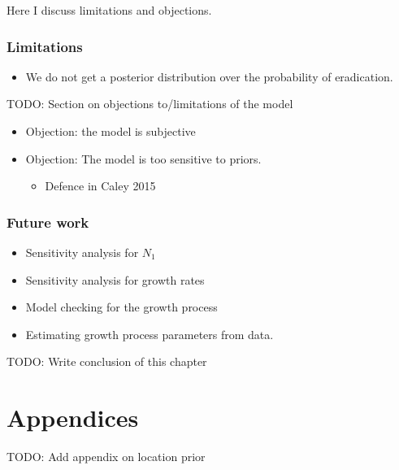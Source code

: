 \documentclass[
  oneside]{book}
\providecommand{\tightlist}{%
  \setlength{\itemsep}{0pt}\setlength{\parskip}{0pt}}
\begin{document}
Here I discuss limitations and objections.

\hypertarget{limitations}{%
\subsection{Limitations}\label{limitations}}

\begin{itemize}
\tightlist
\item
  We do not get a posterior distribution over the probability of eradication.
\end{itemize}

TODO: Section on objections to/limitations of the model

\begin{itemize}
\tightlist
\item
  Objection: the model is subjective
\item
  Objection: The model is too sensitive to priors.

  \begin{itemize}
  \tightlist
  \item
    Defence in Caley 2015
  \end{itemize}
\end{itemize}

\hypertarget{future-work}{%
\subsection{Future work}\label{future-work}}

\begin{itemize}
\tightlist
\item
  Sensitivity analysis for \(N_1\)
\item
  Sensitivity analysis for growth rates
\item
  Model checking for the growth process
\item
  Estimating growth process parameters from data.
\end{itemize}

TODO: Write conclusion of this chapter

\renewcommand{\baselinestretch}{1}\normalsize

\hypertarget{appendices}{%
\chapter{Appendices}\label{appendices}}

TODO: Add appendix on location prior
\end{document}
